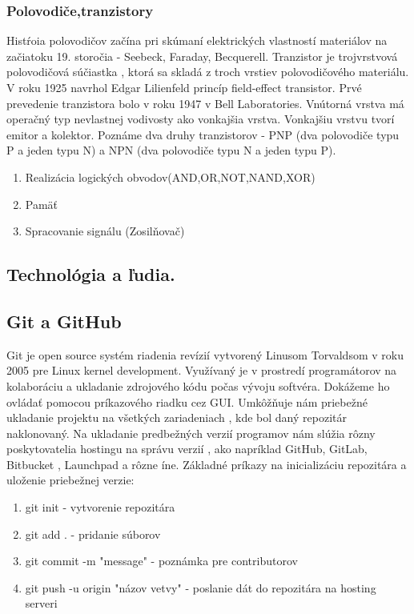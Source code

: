 \documentclass[10pt,oneside,slovak,a4paper]{article}
\begin{document}
\subsubsection{Polovodiče,tranzistory}
Histŕoia polovodičov začína pri skúmaní elektrických vlastností materiálov na začiatoku 19. storočia - Seebeck, Faraday, Becquerell. \newline Tranzistor je trojvrstvová polovodičová súčiastka , ktorá sa skladá z troch vrstiev polovodičového materiálu. V roku 1925 navrhol Edgar Lilienfeld princíp field-effect transistor. Prvé prevedenie tranzistora bolo v roku 1947 v Bell Laboratories. Vnútorná vrstva má operačný typ nevlastnej vodivosty ako vonkajšia vrstva. Vonkajšiu vrstvu tvorí emitor a kolektor. Poznáme dva druhy tranzistorov - PNP  (dva polovodiče typu P a jeden typu N) a NPN (dva polovodiče typu N a jeden typu P).
\begin{enumerate}
    \item{Realizácia logických obvodov(AND,OR,NOT,NAND,XOR)}
    \item{Pamäť}
    \item{Spracovanie signálu (Zosilňovač)}
\end{enumerate}
\subsection{Technológia a ľudia.}

\subsection{Git a GitHub}
Git je open source systém riadenia revízií vytvorený Linusom Torvaldsom v roku 2005 pre Linux kernel development. Využívaný je v prostredí programátorov na kolaboráciu a ukladanie zdrojového kódu počas vývoju softvéra. Dokážeme ho ovládať pomocou príkazového riadku cez GUI. Umkôžňuje nám priebežné ukladanie projektu na všetkých zariadeniach , kde bol daný repozitár naklonovaný. Na ukladanie predbežných verzií programov nám slúžia rôzny poskytovatelia hostingu na správu verzií , ako napríklad GitHub, GitLab, Bitbucket , Launchpad a rôzne íne. Základné príkazy na inicializáciu repozitára a uloženie priebežnej verzie: 
\begin{enumerate}
    \item{git init - vytvorenie repozitára}
    \item{git add . - pridanie súborov}
    \item{git commit -m "message" - poznámka pre contributorov}
    \item{git push -u origin "názov vetvy" - poslanie dát do repozitára na hosting serveri}
\end{enumerate}
\end{document}
